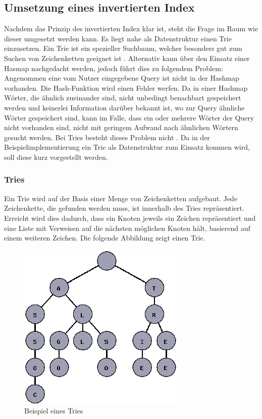 \subsection{Umsetzung eines invertierten Index}
Nachdem das Prinzip des invertierten Index klar ist, steht die Frage im Raum wie dieser umgesetzt werden kann.
Es liegt nahe als Datenstruktur einen Trie einzusetzen. Ein Trie ist ein spezieller Suchbaum, welcher besonders gut zum Suchen von Zeichenketten geeignet ist \cite{IR_Intro_Cambridge}.
\newline
Alternativ kann über den Einsatz einer Hasmap nachgedacht werden, jedoch führt dies zu folgendem Problem:
Angenommen eine vom Nutzer eingegebene Query ist nicht in der Hashmap vorhanden. Die Hash-Funktion wird einen Fehler werfen. Da in einer Hashmap Wörter, die ähnlich zueinander sind, nicht unbedingt benachbart gespeichert werden und keinerlei Information darüber bekannt ist, wo zur Query ähnliche Wörter gespeichert sind, kann im Falle, dass ein oder mehrere Wörter der Query nicht vorhanden sind, nicht mit geringem Aufwand nach ähnlichen Wörtern gesucht werden. Bei Tries besteht dieses Problem nicht \cite{IR_Intro_Cambridge}. 
\newline
Da in der Beispielimplementierung ein Trie als Datenstruktur zum Einsatz kommen wird, soll diese kurz vorgestellt werden.

\subsubsection{Tries}
Ein Trie wird auf der Basis einer Menge von Zeichenketten aufgebaut. Jede Zeichenkette, die gefunden werden muss, ist innerhalb des Tries repräsentiert.
\newline
Erreicht wird dies dadurch, dass ein Knoten jeweils ein Zeichen repräsentiert und eine Liste mit Verweisen auf die nächsten möglichen Knoten hält, basierend auf einem weiteren Zeichen.
Die folgende Abbildung zeigt einen Trie.

\begin{figure}[H]
	\centering
	\includegraphics[scale=0.7]{../Abbildungen/trie.png}
	\caption{Beispiel eines Tries \cite{trie_Abb}}
\end{figure}

